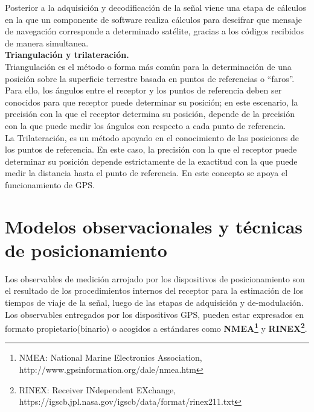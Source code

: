 Posterior a la adquisición y decodificación de la señal viene una etapa de cálculos en la que un componente de software realiza cálculos para descifrar que mensaje de navegación corresponde a determinado satélite, gracias a los códigos recibidos de manera simultanea.\\


\textbf{Triangulación y trilateración.}\\

Triangulación es el método o forma más común para la  determinación de una posición sobre la superficie terrestre basada en puntos de referencias o “faros”. Para ello, los ángulos entre el receptor y los puntos de referencia deben ser conocidos para que receptor puede determinar su posición; en este escenario, la precisión con la que el receptor determina su posición, depende de la precisión con la que puede medir los ángulos con respecto a cada punto de referencia.\\
 
La Trilateración, es un método apoyado en el conocimiento de las posiciones de los puntos de referencia. En este caso, la precisión con la que el receptor puede determinar su posición depende estrictamente de la exactitud con la que puede medir la distancia hasta el punto de referencia. En este concepto se apoya el funcionamiento de GPS.

\section{Modelos observacionales y técnicas de posicionamiento}

Los observables de medición arrojado por los dispositivos de posicionamiento son el resultado de los procedimientos internos del receptor para la estimación de los tiempos de viaje de la señal, luego de las etapas de adquisición y de-modulación. Los observables entregados por los dispositivos GPS, pueden estar expresados en formato propietario(binario) o acogidos a estándares como \textbf{NMEA\footnote{NMEA: National Marine Electronics Association,  http://www.gpsinformation.org/dale/nmea.htm}} y \textbf{RINEX\footnote{RINEX: Receiver INdependent EXchange, https://igscb.jpl.nasa.gov/igscb/data/format/rinex211.txt}}.\\


